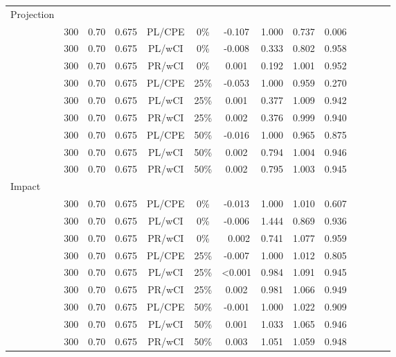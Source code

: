 \documentclass[12pt]{article}
\begin{document}
\begin{table}[ht]
\begin{tabular}{lccccccccccccc}
 \hline
 \hline
  Projection &&&&&&&&& \\
&   300 &0.70 & 0.675 & PL/CPE & 0\% &  -0.107 & 1.000 & 0.737 & 0.006 \\ 
& 300 &0.70 & 0.675 & PL/wCI &0\%  &  -0.008 & 0.333 & 0.802 & 0.958 \\
& 300 &0.70 & 0.675 & PR/wCI &0\%  &  0.001 & 0.192 & 1.001 & 0.952 \\
\hline
& 300 &0.70 & 0.675 & PL/CPE  &25\% &  -0.053 & 1.000 & 0.959 & 0.270 \\ 
& 300 &0.70 & 0.675 & PL/wCI &25\%  &   0.001 & 0.377 & 1.009 & 0.942 \\ 
& 300 &0.70 & 0.675 & PR/wCI &25\%  &   0.002 & 0.376 & 0.999 & 0.940 \\
\hline
& 300 &0.70 & 0.675 & PL/CPE  &50\%  &   -0.016 & 1.000 & 0.965 & 0.875 \\ 
& 300 &0.70 & 0.675 & PL/wCI &50\%  &  0.002 & 0.794 & 1.004 & 0.946 \\ 
& 300 &0.70 & 0.675 & PR/wCI &50\%  &   0.002 & 0.795 & 1.003 & 0.945 \\
  \hline
  \hline
  Impact &&&&&&&&& \\
&  300 &0.70 & 0.675 & PL/CPE   &0\%  &  -0.013 & 1.000 & 1.010 & 0.607 \\ 
& 300 &0.70 & 0.675 & PL/wCI &0\%  &   -0.006 & 1.444 & 0.869 & 0.936 \\ 
& 300 &0.70 & 0.675 & PR/wCI &0\%  &  \ 0.002 & 0.741 & 1.077 & 0.959 \\ 
\hline
&   300 &0.70 & 0.675 & PL/CPE   &25\%  & -0.007 & 1.000 & 1.012 & 0.805 \\
& 300 &0.70 & 0.675 & PL/wCI &25\%  &  <0.001 & 0.984 & 1.091 & 0.945 \\
& 300 &0.70 & 0.675 & PR/wCI &25\%  & 0.002 & 0.981 & 1.066 & 0.949 \\ 
\hline
& 300 &0.70 & 0.675 & PL/CPE   & 50\%  &   -0.001 & 1.000 & 1.022 & 0.909 \\
& 300 &0.70 & 0.675 & PL/wCI &50\% &   0.001 & 1.033 & 1.065 & 0.946 \\
& 300 &0.70 & 0.675 & PR/wCI &50\% &   0.003 & 1.051 & 1.059 & 0.948 \\
  \hline
  \hline
\end{tabular}
\end{table}
\end{document}

